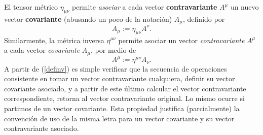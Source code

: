 El tensor métrico $\eta_{\mu\nu}$ permite \textit{asociar} a cada vector
\textbf{contravariante} $A^\mu$ un nuevo vector \textbf{covariante}  (abusando
un poco de la notación) $A_\mu$, definido por
\begin{equation}
A_\mu:=\eta_{\mu\nu}A^\nu.
\end{equation}
Similarmente, la métrica inversa $\eta^{\mu\nu}$ permite asociar un vector
\textit{contravariante} $A^\mu$ a cada vector \textit{covariante} $A_\mu$, por
medio de
\begin{equation}
A^\mu:=\eta^{\mu\nu}A_\nu.
\end{equation}
A partir de (\ref{definv}) es simple verificar que la secuencia de operaciones consistente en tomar un vector contravariante cualquiera, definir su vector covariante asociado, y a partir de este último calcular el vector contravariante correspondiente, retorna al vector contravariante original. Lo mismo ocurre si partimos de un vector covariante. Esta propiedad justifica (parcialmente) la convención de uso de la misma letra para un vector covariante y su vector contravariante asociado.

